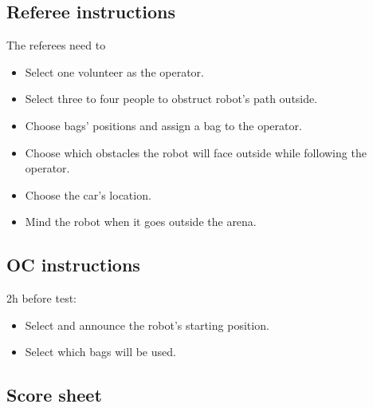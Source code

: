 \subsection*{Referee instructions}

The referees need to
\begin{itemize}[nosep]
	\item Select one volunteer as the operator.
	\item Select three to four people to obstruct robot's path outside.
	\item Choose bags' positions and assign a bag to the operator.
	\item Choose which obstacles the robot will face outside while following the operator.
	\item Choose the car's location.
	\item Mind the robot when it goes outside the arena.
\end{itemize}

\subsection*{OC instructions}

2h before test:
\begin{itemize}[nosep]
	\item Select and announce the robot's starting position.
	\item Select which bags will be used.
\end{itemize}

\subsection*{Score sheet}

